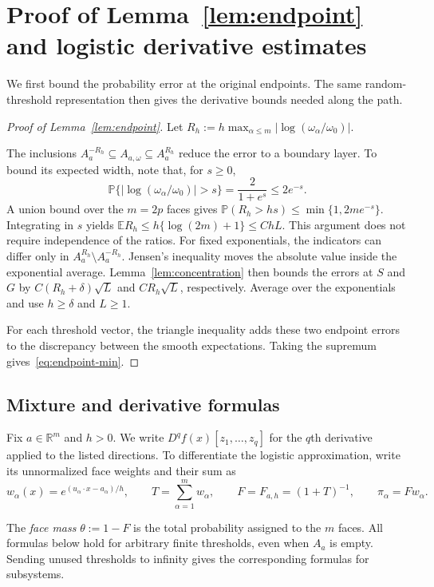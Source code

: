 \documentclass[11pt,letterpaper]{article}
\theoremstyle{remark}
\newcommand{\E}{\mathbb E}
\newcommand{\Pp}{\mathbb P}
\newcommand{\R}{\mathbb R}
\begin{document}
\section{Proof of Lemma~\ref*{lem:endpoint} and logistic derivative estimates}\label{appx-sec:smoothing}
We first bound the probability error at the original endpoints.
The same random-threshold representation then gives the derivative
bounds needed along the path.
\begin{proof}[Proof of Lemma~\ref{lem:endpoint}]
Let \(R_h:=h\max_{\alpha\le m}|\log(\omega_\alpha/\omega_0)|\).

The inclusions \(A_a^{-R_h}\subseteq A_{a,\omega}\subseteq A_a^{R_h}\)
reduce the error to a boundary layer. To bound its expected width,
note that, for \(s\ge0\),
\[
 \Pp\{|\log(\omega_\alpha/\omega_0)|>s\}
 =\frac2{1+e^s}\le2e^{-s}.
\]
A union bound over the \(m=2p\) faces gives
\(\Pp(R_h>hs)\le\min\{1,2me^{-s}\}\). Integrating in \(s\)
yields \(\E R_h\le h\{\log(2m)+1\}\le ChL\). This argument
does not require independence of the ratios.
For fixed exponentials, the indicators can differ only in
\(A_a^{R_h}\setminus A_a^{-R_h}\). Jensen's inequality moves
the absolute value inside the exponential average.
Lemma~\ref{lem:concentration} then bounds the errors at \(S\)
and \(G\) by \(C(R_h+\delta)\sqrt L\) and \(CR_h\sqrt L\),
respectively. Average over the exponentials and use \(h\ge\delta\)
and \(L\ge1\).

For each threshold vector, the triangle inequality adds these two
endpoint errors to the discrepancy between the smooth expectations.
Taking the supremum gives~\eqref{eq:endpoint-min}.
\end{proof}

\subsection{\texorpdfstring{Mixture and derivative formulas}{Mixture and derivative formulas}}\label{appx-sec:mixture}

Fix \(a\in\R^m\) and \(h>0\). We write
\(D^qf(x)[z_1,\ldots,z_q]\) for the \(q\)th derivative applied to
the listed directions. To differentiate the logistic approximation,
write its unnormalized face weights and their sum as
\[
 w_\alpha(x)=e^{(u_\alpha\cdot x-a_\alpha)/h},\qquad
 T=\sum_{\alpha=1}^m w_\alpha,\qquad
 F=F_{a,h}=(1+T)^{-1},\qquad \pi_\alpha=Fw_\alpha.
\]

The \emph{face mass} \(\theta:=1-F\) is the total probability assigned
to the \(m\) faces. All formulas below hold for arbitrary finite
thresholds, even when \(A_a\) is empty. Sending unused thresholds
to infinity gives the corresponding formulas for subsystems.
\end{document}
